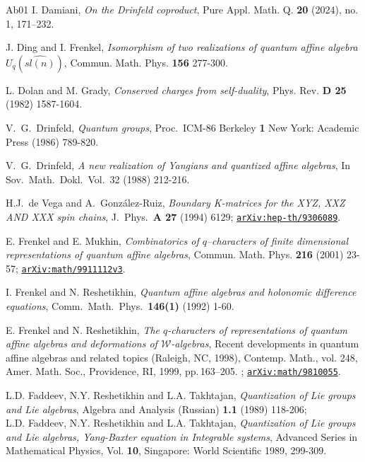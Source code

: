 \documentclass[11pt]{amsart}
\numberwithin{equation}{section}
\numberwithin{equation}{section}
\begin{document}
\begin{thebibliography}{Ab01}
I. Damiani, {\it On the Drinfeld coproduct}, Pure Appl. Math. Q. {\bf 20} (2024), no. 1, 171–232.


J. Ding and I. Frenkel, {\it Isomorphism of two realizations of quantum affine algebra $U_q(\widehat{sl(n)})$}, Commun. Math. Phys. {\bf 156} 277-300.

%
L. Dolan and M. Grady, {\it Conserved charges from self-duality}, Phys. Rev. {\bf D 25} (1982) 1587-1604.

V.\ G.\ Drinfeld, {\it Quantum groups}, Proc.\ ICM-86 Berkeley {\bf 1} New York:
Academic Press  (1986) 789-820.

V.\ G.\ Drinfeld, \textit{A new realization of Yangians and quantized affine algebras}, In Sov.\ Math.\ Dokl.\,  Vol.\ 32 (1988) 212-216.

H.J.\ de Vega and A.\ Gonz\'alez-Ruiz, {\it Boundary K-matrices for the XYZ, XXZ AND XXX spin chains}, J.\ Phys.\ {\bf A 27} (1994) 6129; \href{https://arxiv.org/abs/hep-th/9306089}{\tt arXiv:hep-th/9306089}.

E. Frenkel and E. Mukhin, {\it Combinatorics of $q$–characters of finite dimensional representations of quantum affine algebras}, Commun. Math. Phys. {\bf 216} (2001) 23-57; \href{https://arxiv.org/abs/math/9911112v3}{\tt arXiv:math/9911112v3}.

I. Frenkel and N. Reshetikhin, {\it Quantum affine algebras and holonomic difference equations},  Comm.\ Math.\ Phys.\ {\bf 146(1)} (1992) 1-60.

E. Frenkel and N. Reshetikhin, \emph{The {$q$}-characters of representations of
	quantum affine algebras and deformations of {$\mathcal{W}$}-algebras}, Recent
developments in quantum affine algebras and related topics ({R}aleigh, {NC},
1998), Contemp. Math., vol. 248, Amer. Math. Soc., Providence, RI, 1999,
pp.\,163--205. ; \href{https://arxiv.org/abs/math/9810055}{\tt arXiv:math/9810055}.

L.D. Faddeev, N.Y. Reshetikhin and L.A. Takhtajan, {\it Quantization of Lie groups and Lie algebras},
Algebra and Analysis (Russian) {\bf 1.1}  (1989) 118-206;\\
L.D. Faddeev, N.Y. Reshetikhin and L.A. Takhtajan, {\it Quantization of Lie groups and Lie algebras, Yang-Baxter equation in Integrable systems}, Advanced Series in Mathematical Physics, Vol. {\bf 10}, Singapore: World Scientific 1989, 299-309.



\end{thebibliography}
\end{document}

